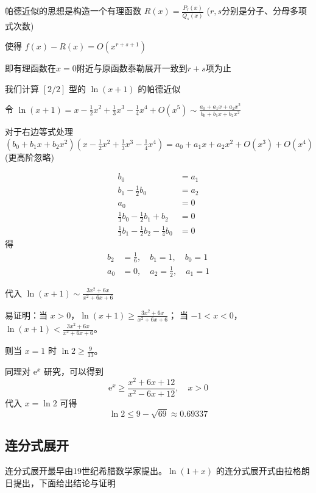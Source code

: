 \documentclass[12pt]{article}
\theoremstyle{definition}
\theoremstyle{plain}
\theoremstyle{definition}
\newcommand{\ee}{\mathrm{e}}
\begin{document}
帕德近似的思想是构造一个有理函数 \(R(x) = \frac{P_{r}(x)}{Q_{s}(x)}\)
(\(r,s\)分别是分子、分母多项式次数)

使得 \(f(x) - R(x) = O\left( x^{r + s + 1} \right)\)

即有理函数在\(x = 0\)附近与原函数泰勒展开一致到\(r + s\)项为止

我们计算 $[2/2]$ 型的 \(\ln(x + 1)\) 的帕德近似

令
\(\ln(x + 1) = x - \frac{1}{2}x^{2} + \frac{1}{3}x^{3} - \frac{1}{4}x^{4} + O\left( x^{5} \right) \sim \frac{a_{0} + a_{1}x + a_{2}x^{2}}{b_{0} + b_{1}x + b_{2}x^{2}}\)

对于右边等式处理
\(\left( b_{0} + b_{1}x + b_{2}x^{2} \right)\left( x - \frac{1}{2}x^{2} + \frac{1}{3}x^{3} - \frac{1}{4}x^{4} \right) = a_{0} + a_{1}x + a_{2}x^{2} + O\left( x^{3} \right) + O\left( x^{4} \right)\)
(更高阶忽略)

\begin{align*}
b_{0} &= a_{1} \\
b_{1} - \frac{1}{2}b_{0} &= a_{2} \\
a_{0} &= 0 \\
\frac{1}{3}b_{0} - \frac{1}{2}b_{1} + b_{2} &= 0 \\
\frac{1}{3}b_{1} - \frac{1}{2}b_{2} - \frac{1}{4}b_{0} &= 0
\end{align*}
得
\begin{align*}
b_{2} &= \frac{1}{6}, \quad b_{1} = 1, \quad b_{0} = 1 \\
a_{0} &= 0, \quad a_{2} = \frac{1}{2}, \quad a_{1} = 1
\end{align*}

代入 \(\ln(x + 1) \sim \frac{3x^{2} + 6x}{x^{2} + 6x + 6}\)

易证明：当 \(x > 0\)，\(\ln(x + 1) \geq \frac{3x^{2} + 6x}{x^{2} + 6x + 6}\)；
当 \(-1 < x < 0\)，\(\ln(x + 1) < \frac{3x^{2} + 6x}{x^{2} + 6x + 6}\)。

则当 \(x = 1\) 时 \(\ln 2 \geq \frac{9}{13}\)。

同理对 \(\ee^{x}\) 研究，可以得到
\[\ee^{x} \geq \frac{x^{2} + 6x + 12}{x^{2} - 6x + 12}, \quad x > 0\]
代入 \(x = \ln 2\) 可得
\[\ln 2 \leq 9 - \sqrt{69} \approx 0.69337\]

\subsection{连分式展开}

连分式展开最早由19世纪希腊数学家提出。\(\ln(1 + x)\) 的连分式展开式由拉格朗日提出，下面给出结论与证明
\end{document}
